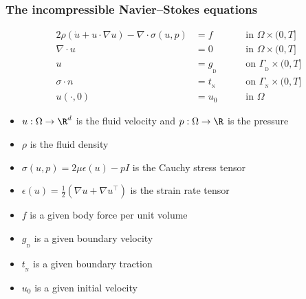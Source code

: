 \begin{frame}
  \frametitle{The incompressible Navier--Stokes equations}

  \vspace{-0.5cm}

  \begin{alignat*}{2}
    \rho (\dot{u} + u \cdot \nabla u)
    - \nabla \cdot \sigma(u, p) &= f && \quad \text{ in } \Omega \times (0, T] \\
    \nabla \cdot u &= 0 && \quad \text{ in } \Omega \times (0, T] \\
    u &= g_{_\mathrm{D}} && \quad \text{ on } \Gamma_{_\mathrm{D}} \times (0, T] \\
    \sigma \cdot n &= t_{_\mathrm{N}} && \quad \text{ on } \Gamma_{_\mathrm{N}} \times (0, T] \\
    u(\cdot, 0) &= u_0 && \quad \text{ in } \Omega
  \end{alignat*}

  \linespread{1}
  \begin{itemize}
  \item
    $u : \Omega \rightarrow \R^d$ is the fluid velocity and $p : \Omega \rightarrow \R$ is the pressure
  \item
    $\rho$ is the fluid density
  \item
    $\sigma(u, p) = 2\mu\epsilon(u) - pI$ is the Cauchy stress tensor
  \item
    $\epsilon(u) = \frac{1}{2}(\nabla u + \nabla u^{\top})$ is the
    strain rate tensor
  \item
    $f$ is a given body force per unit volume
  \item
    $g_{_\mathrm{D}}$ is a given boundary velocity
  \item
    $t_{_\mathrm{N}}$ is a given boundary traction
  \item
    $u_0$ is a given initial velocity
  \end{itemize}
  \linespread{1.5}

\end{frame}
